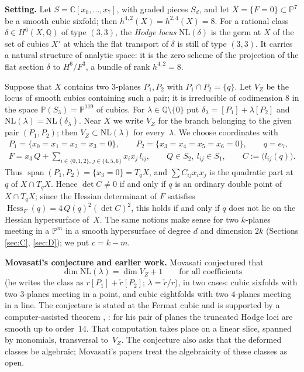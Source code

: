 \documentclass[10pt]{article}
\numberwithin{equation}{section}
\theoremstyle{remark}
\newcommand{\PP}{\mathbb{P}}
\newcommand{\CC}{\mathbb{C}}
\newcommand{\QQ}{\mathbb{Q}}
\newcommand{\NL}{\mathrm{NL}}
\newcommand{\VZ}{V_Z}
\newcommand{\Hess}{\operatorname{Hess}}
\newcommand{\run}[1]{\medskip\noindent\textbf{#1}}
\begin{document}
\run{Setting.}
Let $S=\CC[x_0,\dots,x_7]$, with graded pieces $S_d$, and let $X=\{F=0\}\subset\PP^7$ be a smooth cubic sixfold;
then $h^{4,2}(X)=h^{2,4}(X)=8$. For a rational class $\delta\in H^6(X,\QQ)$ of type $(3,3)$, the \emph{Hodge
locus} $\NL(\delta)$ is the germ at $X$ of the set of cubics $X'$ at which the flat transport of $\delta$ is
still of type $(3,3)$. It carries a natural structure of analytic space: it is the zero scheme of the projection
of the flat section $\delta$ to $H^6/F^3$, a bundle of rank $h^{4,2}=8$.

Suppose that $X$ contains two $3$-planes $P_1,P_2$ with $P_1\cap P_2=\{q\}$. Let $\VZ$ be the locus of smooth
cubics containing such a pair; it is irreducible of codimension $8$ in the space $\PP(S_3)=\PP^{119}$ of cubics.
For $\lambda\in\QQ\setminus\{0\}$ put $\delta_\lambda=[P_1]+\lambda[P_2]$ and $\NL(\lambda)=\NL(\delta_\lambda)$.
Near $X$ we write $\VZ$ for the branch belonging to the given pair $(P_1,P_2)$; then $\VZ\subset\NL(\lambda)$
for every~$\lambda$. We choose coordinates with
\begin{equation}\label{eq:coords}
\begin{gathered}
P_1=\{x_0=x_1=x_2=x_3=0\},\qquad P_2=\{x_3=x_4=x_5=x_6=0\},\qquad q=e_7,\\
F=x_3\,Q+\sum_{i\in\{0,1,2\},\,j\in\{4,5,6\}}x_ix_j\,l_{ij},\qquad Q\in S_2,\ l_{ij}\in S_1,\qquad
C:=\bigl(l_{ij}(q)\bigr).
\end{gathered}
\end{equation}
Thus $\operatorname{span}(P_1,P_2)=\{x_3=0\}=T_qX$, and $\sum C_{ij}x_ix_j$ is the quadratic part at $q$ of
$X\cap T_qX$. Hence $\det C\neq 0$ if and only if $q$ is an ordinary double point of $X\cap T_qX$; since the
Hessian determinant of $F$ satisfies $\Hess_F(q)=4\,Q(q)^2(\det C)^2$, this holds if and only if $q$ does not
lie on the Hessian hypersurface of~$X$. The same notions make sense for two $k$-planes meeting in a $\PP^m$ in a
smooth hypersurface of degree $d$ and dimension $2k$ (Sections \ref{sec:C}, \ref{sec:D}); we put $c=k-m$.

\run{Movasati's conjecture and earlier work.}
Movasati \cite[Conjecture~1]{Mo1} conjectured that
\begin{equation}\label{eq:conj}
\dim\NL(\lambda)=\dim\VZ+1\qquad\text{for all coefficients}
\end{equation}
(he writes the class as $r[P_1]+\check r[P_2]$; $\lambda=\check r/r$), in two cases: cubic sixfolds with two
$3$-planes meeting in a point, and cubic eightfolds with two $4$-planes meeting in a line. The conjecture is
stated at the Fermat cubic and is supported by a computer-assisted theorem \cite{Mo2}, \cite[Theorem~8]{Mo1}:
for his pair of planes the truncated Hodge loci are smooth up to order~$14$. That computation takes place on a
linear slice, spanned by monomials, transversal to~$\VZ$. The conjecture also asks that the deformed classes be
algebraic; Movasati's papers \cite{Mo1,Mo2} treat the algebraicity of these classes as open.
\end{document}
